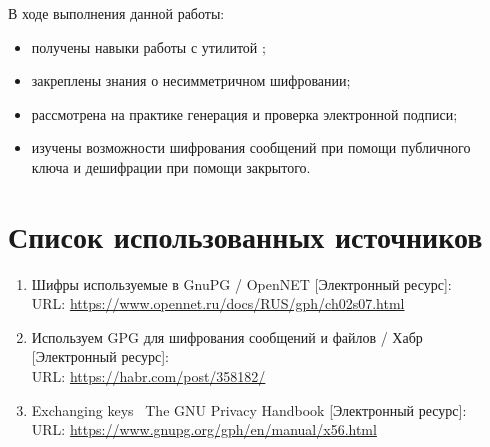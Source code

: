 В ходе выполнения данной работы:

\begin{itemize}
	\item получены навыки работы с утилитой ;
	\item закреплены знания о несимметричном шифровании;
	\item рассмотрена на практике генерация и проверка электронной подписи;
	\item изучены возможности шифрования сообщений при помощи публичного ключа и дешифрации при помощи закрытого. 
\end{itemize}

\section*{Список использованных источников}

\begin{enumerate}
	\item Шифры используемые в GnuPG / OpenNET [Электронный ресурс]:\\
	URL: {\small\url{https://www.opennet.ru/docs/RUS/gph/ch02s07.html}}
	\item Используем GPG для шифрования сообщений и файлов / Хабр [Электронный ресурс]:\\
		URL: {\small\url{https://habr.com/post/358182/}}
	\item Exchanging keys \ The GNU Privacy Handbook [Электронный ресурс]:\\
		URL: {\small\url{https://www.gnupg.org/gph/en/manual/x56.html}}
\end{enumerate}


